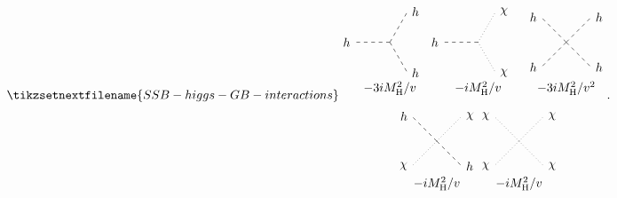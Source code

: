 \documentclass[fleqn]{NotesClass}
\newcommand{\Pparticle}[1]{\mathrm{#1}}
\newcommand{\Phiggs}{\ensuremath{\Pparticle{H}}}
\begin{document}
    \begin{equation}
        \tikzsetnextfilename{SSB-higgs-GB-interactions}
        \begin{tikzpicture}[baseline=(current bounding box)]
            \draw[dashed] (0, 0) -- (-1, 0) node [left] {\(h\)};
            \draw[dashed] (0, 0) -- (60:1) node [right] {\(h\)};
            \draw[dashed] (0, 0) -- (-60:1) node [right] {\(h\)};
            \draw[dashed] (2.5, 0) -- ++ (-1, 0) node [left] {\(h\)};
            \draw[dotted] (2.5, 0) -- ++ (60:1) node [right] {\(\chi\)};
            \draw[dotted] (2.5, 0) -- ++ (-60:1) node [right] {\(\chi\)};
            \draw[dashed] (5, 0) -- ++ (45:1) node [right] {\(h\)};
            \draw[dashed] (5, 0) -- ++ (135:1) node [left] {\(h\)};
            \draw[dashed] (5, 0) -- ++ (225:1) node [left] {\(h\)};
            \draw[dashed] (5, 0) -- ++ (315:1) node [right] {\(h\)};
            \node at (0, -1.3) {\(-3iM_{\Phiggs}^2/v\)};
            \node at (2.5, -1.3) {\(-iM_{\Phiggs}^2/v\)};
            \node at (5, -1.3) {\(-3iM_{\Phiggs}^2/v^2\)};
            \draw[dotted] (1.33, -2.8) -- ++ (45:1) node [right] {\(\chi\)};
            \draw[dashed] (1.33, -2.8) -- ++ (135:1) node [left] {\(h\)};
            \draw[dotted] (1.33, -2.8) -- ++ (225:1) node [left] {\(\chi\)};
            \draw[dashed] (1.33, -2.8) -- ++ (315:1) node [right] {\(h\)};
            \draw[dotted] (3.66, -2.8) -- ++ (45:1) node [right] {\(\chi\)};
            \draw[dotted] (3.66, -2.8) -- ++ (135:1) node [left] {\(\chi\)};
            \draw[dotted] (3.66, -2.8) -- ++ (225:1) node [left] {\(\chi\)};
            \draw[dotted] (3.66, -2.8) -- ++ (315:1) node [right] {\(\chi\)};
            \node at (1.33, -4) {\(-iM_{\Phiggs}^2/v\)};
            \node at (3.66, -4) {\(-iM_{\Phiggs}^2/v\)};
        \end{tikzpicture}
        .
    \end{equation}
    
\end{document}
